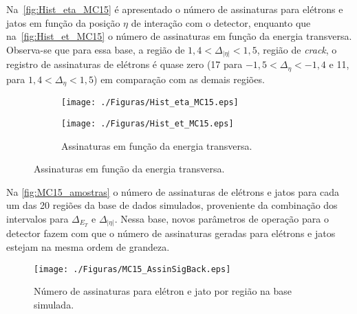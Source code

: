 Na~\autoref{fig:Hist_eta_MC15} é apresentado o número de assinaturas para elétrons e jatos em função da posição $\eta$ de interação com o detector, enquanto que na~\autoref{fig:Hist_et_MC15} o número de assinaturas em função da energia transversa. Observa-se que para essa base, a região de $1,4<\Delta_{|\eta|}< 1,5$, região de \textit{crack}, o registro de assinaturas de elétrons é quase zero (17 para $-1,5< \Delta_{\eta} < -1,4$ e 11, para $1,4< \Delta_{\eta} < 1,5$) em comparação com as demais regiões.


\begin{figure}[H]
	\caption{Distribuição de assinaturas de elétrons e jatos para a base de dados simulados. }\label{fig:Hist_MC15}
	\begin{subfigure}[t]{.5\linewidth}
		\centering
		\label{fig:Hist_eta_MC15}
		\texttt{[image: ./Figuras/Hist\_eta\_MC15.eps]}
	\end{subfigure}%
	\begin{subfigure}[t]{.5\linewidth}
		\centering
		\caption{Assinaturas em função da energia transversa.}
		\texttt{[image: ./Figuras/Hist\_et\_MC15.eps]}
		\label{fig:Hist_et_MC15}
	\end{subfigure}
\end{figure}


Na \autoref{fig:MC15_amostras} o número de assinaturas de elétrons e jatos para cada um das 20 regiões da base de dados simulados, proveniente da combinação dos intervalos para $\Delta_{E_T}$ e $\Delta_{|\eta|}$. Nessa base, novos parâmetros de operação para o detector fazem com que o número de assinaturas geradas para elétrons e jatos estejam na mesma ordem de grandeza. %

\begin{figure}[H]
	\caption{Número de assinaturas para elétron e jato por região na base simulada.}
	\centerline{\texttt{[image: ./Figuras/MC15\_AssinSigBack.eps]}}
	\label{fig:MC15_amostras}
\end{figure}

